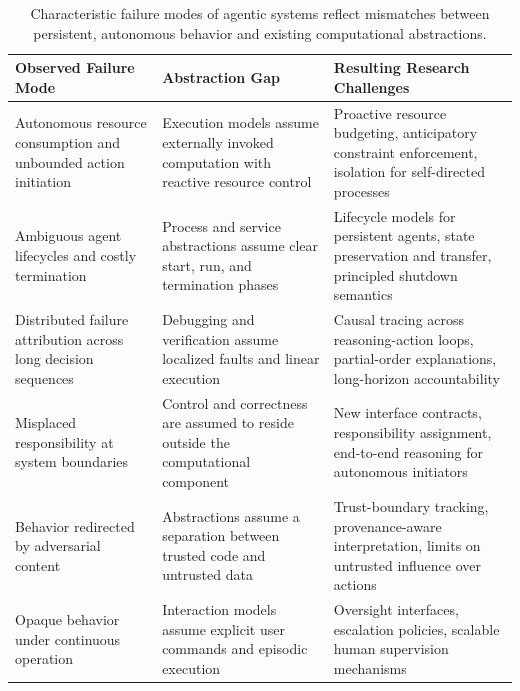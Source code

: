 \documentclass[11pt]{article}
\begin{document}
\begin{table}[t]
\centering
\caption{Characteristic failure modes of agentic systems reflect mismatches between persistent, autonomous behavior and existing computational abstractions.}
\vspace{1ex}

\label{tab:failure_modes}
{}
\begin{tabular}{
>{\raggedright\arraybackslash}p{4.2cm}
>{\raggedright\arraybackslash}p{5.2cm}
>{\raggedright\arraybackslash}p{5.8cm}
}
\hline
\textbf{Observed Failure Mode} &
\textbf{Abstraction Gap} &
\textbf{Resulting Research Challenges} \\
\hline
Autonomous resource consumption and unbounded action initiation &
Execution models assume externally invoked computation with reactive resource control &
Proactive resource budgeting, anticipatory constraint enforcement, isolation for self-directed processes \\[0.5em]

Ambiguous agent lifecycles and costly termination &
Process and service abstractions assume clear start, run, and termination phases &
Lifecycle models for persistent agents, state preservation and transfer, principled shutdown semantics \\[0.5em]

Distributed failure attribution across long decision sequences &
Debugging and verification assume localized faults and linear execution &
Causal tracing across reasoning-action loops, partial-order explanations, long-horizon accountability \\[0.5em]

Misplaced responsibility at system boundaries &
Control and correctness are assumed to reside outside the computational component &
New interface contracts, responsibility assignment, end-to-end reasoning for autonomous initiators \\[0.5em]

Behavior redirected by adversarial content &
Abstractions assume a separation between trusted code and untrusted data &
Trust-boundary tracking, provenance-aware interpretation, limits on untrusted influence over actions \\[0.5em]

Opaque behavior under continuous operation &
Interaction models assume explicit user commands and episodic execution &
Oversight interfaces, escalation policies, scalable human supervision mechanisms \\
\hline
\end{tabular}
\end{table}
\end{document}
